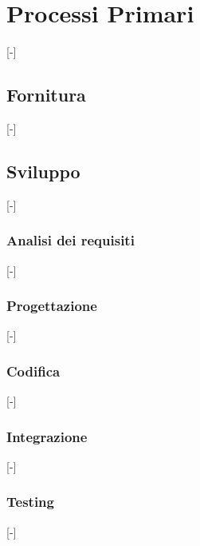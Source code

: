 \section{Processi Primari}
[-]

\subsection{Fornitura}
[-]

\subsection{Sviluppo}
[-]

\subsubsection{Analisi dei requisiti}
[-]

\subsubsection{Progettazione}
[-]

\subsubsection{Codifica}
[-]

\subsubsection{Integrazione}
[-]

\subsubsection{Testing}
[-]